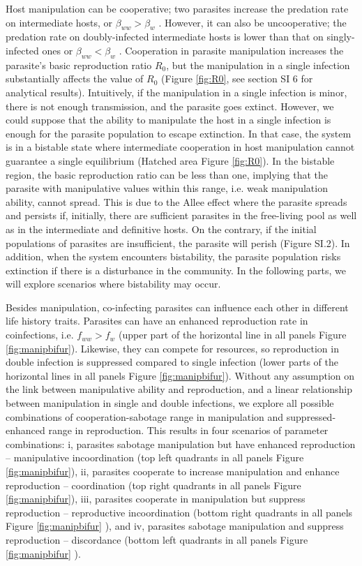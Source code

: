 \documentclass[a4paper]{scrartcl}
\begin{document}
Host manipulation can be cooperative; two parasites increase the predation rate on intermediate hosts, or $\beta_{ww} > \beta_w$ \citep{Hafer:2015gl}. 
However, it can also be uncooperative; the predation rate on doubly-infected intermediate hosts is lower than that on singly-infected ones or $\beta_{ww} < \beta_w$ \citep{Hafer:2015gl}.
Cooperation in parasite manipulation increases the parasite's basic reproduction ratio $R_0$, but the manipulation in a single infection substantially affects the value of $R_0$ (Figure \ref{fig:R0}, see section SI 6 for analytical results). 
Intuitively, if the manipulation in a single infection is minor, there is not enough transmission, and the parasite goes extinct.
However, we could suppose that the ability to manipulate the host in a single infection is enough for the parasite population to escape extinction. 
In that case, the system is in a bistable state where intermediate cooperation in host manipulation cannot guarantee a single equilibrium (Hatched area Figure \ref{fig:R0}). 
In the bistable region, the basic reproduction ratio can be less than one, implying that the parasite with manipulative values within this range, i.e. weak manipulation ability, cannot spread.
This is due to the Allee effect \citep{stephens:OIKOS:1999} where the parasite spreads and persists if, initially, there are sufficient parasites in the free-living pool as well as in the intermediate and definitive hosts.
On the contrary, if the initial populations of parasites are insufficient, the parasite will perish (Figure SI.2).
In addition, when the system encounters bistability, the parasite population risks extinction if there is a disturbance in the community.
In the following parts, we will explore scenarios where bistability may occur. 

Besides manipulation, co-infecting parasites can influence each other in different life history traits.
Parasites can have an enhanced reproduction rate in coinfections, i.e. $f_{ww} > f_w$ (upper part of the horizontal line in all panels Figure \ref{fig:manipbifur}). 
Likewise, they can compete for resources, so reproduction in double infection is suppressed compared to single infection (lower parts of the horizontal lines in all panels Figure \ref{fig:manipbifur}). 
Without any assumption on the link between manipulative ability and reproduction, and a linear relationship between manipulation in single and double infections, we explore all possible combinations of cooperation-sabotage range in manipulation and suppressed-enhanced range in reproduction. This results in four scenarios of parameter combinations: i, parasites sabotage manipulation but have enhanced reproduction -- manipulative incoordination (top left quadrants in all panels Figure \ref{fig:manipbifur}), ii, parasites cooperate to increase manipulation and enhance reproduction -- coordination (top right quadrants in all panels Figure \ref{fig:manipbifur}), iii, parasites cooperate in manipulation but suppress reproduction -- reproductive incoordination (bottom right quadrants in all panels Figure \ref{fig:manipbifur} ), and iv, parasites sabotage manipulation and suppress reproduction -- discordance (bottom left quadrants in all panels Figure \ref{fig:manipbifur} ).
\end{document}
